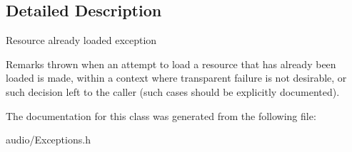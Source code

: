 \subsection{Detailed Description}
Resource already loaded exception \begin{DoxyRemark}{Remarks}
thrown when an attempt to load a resource that has already been loaded is made, within a context where transparent failure is not desirable, or such decision left to the caller (such cases should be explicitly documented). 
\end{DoxyRemark}


The documentation for this class was generated from the following file\+:\begin{DoxyCompactItemize}
\item 
audio/Exceptions.\+h\end{DoxyCompactItemize}
